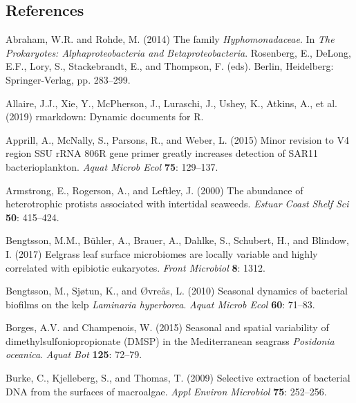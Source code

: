 \documentclass[12pt,]{article}
\begin{document}
\newpage

\hypertarget{references}{%
\subsection{References}\label{references}}

 \setlength{\emergencystretch}{3.5em}

\hypertarget{refs}{}
\leavevmode\hypertarget{ref-Abraham2014}{}%
Abraham, W.R. and Rohde, M. (2014) The family \emph{Hyphomonadaceae}. In
\emph{The Prokaryotes: Alphaproteobacteria and Betaproteobacteria}.
Rosenberg, E., DeLong, E.F., Lory, S., Stackebrandt, E., and Thompson,
F. (eds). Berlin, Heidelberg: Springer-Verlag, pp. 283--299.

\leavevmode\hypertarget{ref-Allaire2019}{}%
Allaire, J.J., Xie, Y., McPherson, J., Luraschi, J., Ushey, K., Atkins,
A., et al. (2019) rmarkdown: Dynamic documents for R.

\leavevmode\hypertarget{ref-Apprill2015}{}%
Apprill, A., McNally, S., Parsons, R., and Weber, L. (2015) Minor
revision to V4 region SSU rRNA 806R gene primer greatly increases
detection of SAR11 bacterioplankton. \emph{Aquat Microb Ecol}
\textbf{75}: 129--137.

\leavevmode\hypertarget{ref-Armstrong2000}{}%
Armstrong, E., Rogerson, A., and Leftley, J. (2000) The abundance of
heterotrophic protists associated with intertidal seaweeds. \emph{Estuar
Coast Shelf Sci} \textbf{50}: 415--424.

\leavevmode\hypertarget{ref-Bengtsson2017}{}%
Bengtsson, M.M., Bühler, A., Brauer, A., Dahlke, S., Schubert, H., and
Blindow, I. (2017) Eelgrass leaf surface microbiomes are locally
variable and highly correlated with epibiotic eukaryotes. \emph{Front
Microbiol} \textbf{8}: 1312.

\leavevmode\hypertarget{ref-Bengtsson2010}{}%
Bengtsson, M., Sjøtun, K., and Øvreås, L. (2010) Seasonal dynamics of
bacterial biofilms on the kelp \emph{Laminaria hyperborea}. \emph{Aquat
Microb Ecol} \textbf{60}: 71--83.

\leavevmode\hypertarget{ref-Borges2015}{}%
Borges, A.V. and Champenois, W. (2015) Seasonal and spatial variability
of dimethylsulfoniopropionate (DMSP) in the Mediterranean seagrass
\emph{Posidonia oceanica}. \emph{Aquat Bot} \textbf{125}: 72--79.

\leavevmode\hypertarget{ref-Burke2009}{}%
Burke, C., Kjelleberg, S., and Thomas, T. (2009) Selective extraction of
bacterial DNA from the surfaces of macroalgae. \emph{Appl Environ
Microbiol} \textbf{75}: 252--256.
\end{document}
